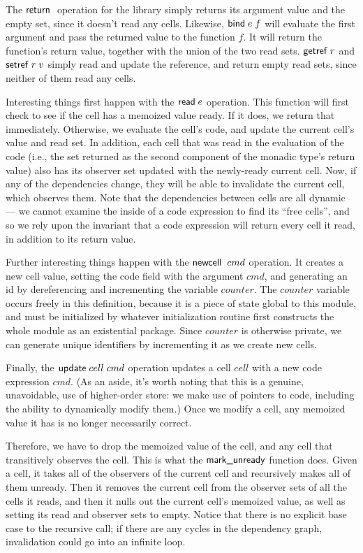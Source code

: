 \documentclass[preprint,natbib]{sigplanconf}
\begin{document}
The $\mbox{\textsf{{return}}}\;$ operation for the library simply returns its argument
value and the empty set, since it doesn't read any cells. Likewise,
$\mbox{\textsf{{bind}}}\; e\;f$ will evaluate the first argument and pass the returned
value to the function $f$. It will return the function's return value,
together with the union of the two read sets. $\mbox{\textsf{{getref}}}\; r$ and $\mbox{\textsf{{setref}}}\; r\;v$
simply read and update the reference, and return empty read sets, since
neither of them read any cells. 

Interesting things first happen with the $\mbox{\textsf{{read}}}\; e$ operation. This
function will first check to see if the cell has a memoized value
ready. If it does, we return that immediately. Otherwise, we evaluate
the cell's code, and update the current cell's value and read set. In
addition, each cell that was read in the evaluation of the code (i.e.,
the set returned as the second component of the monadic type's return
value) also has its observer set updated with the newly-ready current
cell. Now, if any of the dependencies change, they will be able to
invalidate the current cell, which observes them. Note that the
dependencies between cells are all dynamic --- we cannot examine the
inside of a code expression to find its ``free cells'', and so we rely
upon the invariant that a code expression will return every cell it
read, in addition to its return value.

Further interesting things happen with the $\mbox{\textsf{{newcell}}}\;\;cmd$
operation.  It creates a new cell value, setting the code field with
the argument $cmd$, and generating an id by dereferencing and
incrementing the variable $counter$. The $counter$ variable occurs
freely in this definition, because it is a piece of state global to
this module, and must be initialized by whatever initialization
routine first constructs the whole module as an existential package.
Since $counter$ is otherwise private, we can generate unique
identifiers by incrementing it as we create new cells. 

Finally, the $\mbox{\textsf{{update}}}\;cell\;cmd$ operation updates a cell
$cell$ with a new code expression $cmd$. (As an aside, it's worth
noting that this is a genuine, unavoidable, use of higher-order store:
we make use of pointers to code, including the ability to dynamically
modify them.) Once we modify a cell, any memoized value it has is no
longer necessarily correct.

Therefore, we have to drop the memoized value of the cell, and any
cell that transitively observes the cell. This is what the
$\mbox{\textsf{{mark\_unready}}}$ function does. Given a cell, it takes all of the
observers of the current cell and recursively makes all of
them unready. Then it removes the current cell from the observer sets of
all the cells it reads, and then it nulls out the current cell's
memoized value, as well as setting its read and observer sets to
empty. Notice that there is no explicit base case to the recursive
call; if there are any cycles in the dependency graph, invalidation
could go into an infinite loop. 
\end{document}
